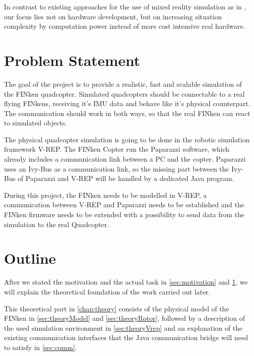 In contrast to existing approaches for the use of mixed reality simulation as in \cite{Chen2011}, our focus lies not on hardware development, but on increasing situation complexity by computation power instead of more cost intensive real hardware.




       


  
\section{Problem Statement}
\label{sec:problem}
    The goal of the project is to provide a realistic, fast and scalable simulation of the FINken quadcopter.  
    Simulated quadcopters should be connectable to a real flying FINkens, receiving it's    
    \gls{IMU} data and behave like it's physical counterpart. 
    The communication should work in both ways, so that the real FINken can react to simulated objects.

The physical quadcopter simulation is going to be done in the robotic simulation framework V-REP\cite{vrep}. 
The FINken Copter run the Paparazzi\cite{pprz} software, which already includes a communication link between a PC and the copter. 
Paparazzi uses an Ivy-Bus as a communication link, so the missing part between the Ivy-Bus of Paparazzi and V-REP will be handled by a dedicated Java program.

During this project, the FINken needs to be modelled in V-REP, a communication between V-REP and Paparazzi needs to be established and the FINken firmware needs to be extended with a possibility to send data from the simulation to the real Quadcopter.
 
         
\section{Outline}
    After we stated the motivation and the actual task in \ref{sec:motivation} and \ref{sec:problem}, we will explain the theoretical foundation of the work carried out later.
    
    This theoretical part in \ref{chap:theory} consists of the physical model of the FINken in \ref{sec:theoryModel} and \ref{sec:theoryRotor}, followed by a description of the used simulation environment in \ref{sec:theoryVrep} and an explanation of the existing communication interfaces that the Java communication bridge will need to satisfy in \ref{sec:comm}.
    
